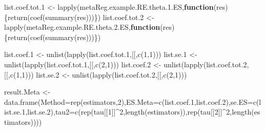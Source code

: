 \documentclass[
]{book}
\newenvironment{Shaded}{\begin{snugshade}}{\end{snugshade}}
\newcommand{\AttributeTok}[1]{\textcolor[rgb]{0.77,0.63,0.00}{#1}}
\newcommand{\ControlFlowTok}[1]{\textcolor[rgb]{0.13,0.29,0.53}{\textbf{#1}}}
\newcommand{\DecValTok}[1]{\textcolor[rgb]{0.00,0.00,0.81}{#1}}
\newcommand{\FloatTok}[1]{\textcolor[rgb]{0.00,0.00,0.81}{#1}}
\newcommand{\FunctionTok}[1]{\textcolor[rgb]{0.00,0.00,0.00}{#1}}
\newcommand{\NormalTok}[1]{#1}
\newcommand{\OtherTok}[1]{\textcolor[rgb]{0.56,0.35,0.01}{#1}}
\newcommand{\SpecialCharTok}[1]{\textcolor[rgb]{0.00,0.00,0.00}{#1}}
\newcommand{\StringTok}[1]{\textcolor[rgb]{0.31,0.60,0.02}{#1}}
\theoremstyle{definition}
\theoremstyle{definition}
\theoremstyle{definition}
\theoremstyle{definition}
\theoremstyle{remark}
\begin{document}
\begin{Shaded}
\begin{Highlighting}[]
\NormalTok{list.coef.tot}\FloatTok{.1} \OtherTok{\textless{}{-}} \FunctionTok{lapply}\NormalTok{(metaReg.example.RE.theta.}\FloatTok{1.}\NormalTok{ES,}\ControlFlowTok{function}\NormalTok{(res)\{}\FunctionTok{return}\NormalTok{(}\FunctionTok{coef}\NormalTok{(}\FunctionTok{summary}\NormalTok{(res)))\})}
\NormalTok{list.coef.tot}\FloatTok{.2} \OtherTok{\textless{}{-}} \FunctionTok{lapply}\NormalTok{(metaReg.example.RE.theta.}\FloatTok{2.}\NormalTok{ES,}\ControlFlowTok{function}\NormalTok{(res)\{}\FunctionTok{return}\NormalTok{(}\FunctionTok{coef}\NormalTok{(}\FunctionTok{summary}\NormalTok{(res)))\})}

\NormalTok{list.coef}\FloatTok{.1} \OtherTok{\textless{}{-}} \FunctionTok{unlist}\NormalTok{(}\FunctionTok{lapply}\NormalTok{(list.coef.tot}\FloatTok{.1}\NormalTok{,}\StringTok{\textquotesingle{}[[\textquotesingle{}}\NormalTok{,}\FunctionTok{c}\NormalTok{(}\DecValTok{1}\NormalTok{,}\DecValTok{1}\NormalTok{)))}
\NormalTok{list.se}\FloatTok{.1} \OtherTok{\textless{}{-}} \FunctionTok{unlist}\NormalTok{(}\FunctionTok{lapply}\NormalTok{(list.coef.tot}\FloatTok{.1}\NormalTok{,}\StringTok{\textquotesingle{}[[\textquotesingle{}}\NormalTok{,}\FunctionTok{c}\NormalTok{(}\DecValTok{2}\NormalTok{,}\DecValTok{1}\NormalTok{)))}
\NormalTok{list.coef}\FloatTok{.2} \OtherTok{\textless{}{-}} \FunctionTok{unlist}\NormalTok{(}\FunctionTok{lapply}\NormalTok{(list.coef.tot}\FloatTok{.2}\NormalTok{,}\StringTok{\textquotesingle{}[[\textquotesingle{}}\NormalTok{,}\FunctionTok{c}\NormalTok{(}\DecValTok{1}\NormalTok{,}\DecValTok{1}\NormalTok{)))}
\NormalTok{list.se}\FloatTok{.2} \OtherTok{\textless{}{-}} \FunctionTok{unlist}\NormalTok{(}\FunctionTok{lapply}\NormalTok{(list.coef.tot}\FloatTok{.2}\NormalTok{,}\StringTok{\textquotesingle{}[[\textquotesingle{}}\NormalTok{,}\FunctionTok{c}\NormalTok{(}\DecValTok{2}\NormalTok{,}\DecValTok{1}\NormalTok{)))}

\NormalTok{result.Meta }\OtherTok{\textless{}{-}} \FunctionTok{data.frame}\NormalTok{(}\AttributeTok{Method=}\FunctionTok{rep}\NormalTok{(estimators,}\DecValTok{2}\NormalTok{),}\AttributeTok{ES.Meta=}\FunctionTok{c}\NormalTok{(list.coef}\FloatTok{.1}\NormalTok{,list.coef}\FloatTok{.2}\NormalTok{),}\AttributeTok{se.ES=}\FunctionTok{c}\NormalTok{(list.se}\FloatTok{.1}\NormalTok{,list.se}\FloatTok{.2}\NormalTok{),}\AttributeTok{tau2=}\FunctionTok{c}\NormalTok{(}\FunctionTok{rep}\NormalTok{(tau[[}\DecValTok{1}\NormalTok{]]}\SpecialCharTok{\^{}}\DecValTok{2}\NormalTok{,}\FunctionTok{length}\NormalTok{(estimators)),}\FunctionTok{rep}\NormalTok{(tau[[}\DecValTok{2}\NormalTok{]]}\SpecialCharTok{\^{}}\DecValTok{2}\NormalTok{,}\FunctionTok{length}\NormalTok{(estimators))))}


\end{Highlighting}
\end{Shaded}
\end{document}
